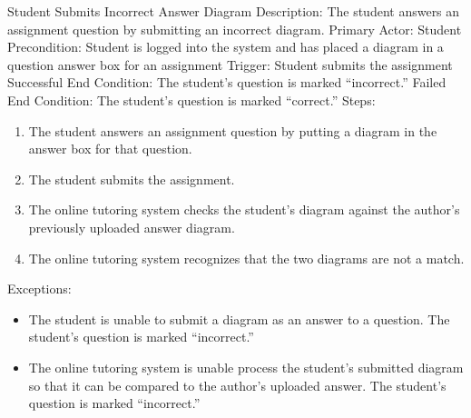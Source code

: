     \begin{section}{Student Submits Incorrect Answer Diagram}
        Description: The student answers an assignment question by submitting an incorrect diagram.
        Primary Actor: Student
        Precondition: Student is logged into the system and has placed a diagram in a question answer box for an assignment  
        Trigger: Student submits the assignment
        Successful End Condition: The student’s question is marked “incorrect.”
        Failed End Condition: The student’s question is marked “correct.”
        Steps:
        \begin{enumerate}
            \item{The student answers an assignment question by putting a diagram in the answer box for that question.}
            \item{The student submits the assignment.}
            \item{The online tutoring system checks the student’s diagram against the author’s previously uploaded answer diagram.}
            \item{The online tutoring system recognizes that the two diagrams are not a match.} 
        \end{enumerate}
        Exceptions:
        \begin{itemize}
            \item{The student is unable to submit a diagram as an answer to a question.  The student’s question is marked “incorrect.”}  
            \item{The online tutoring system is unable process the student’s submitted diagram so that it 
            can be compared to the author’s uploaded answer.  The student’s question is marked “incorrect.”}
        \end{itemize}
    \end{section}




